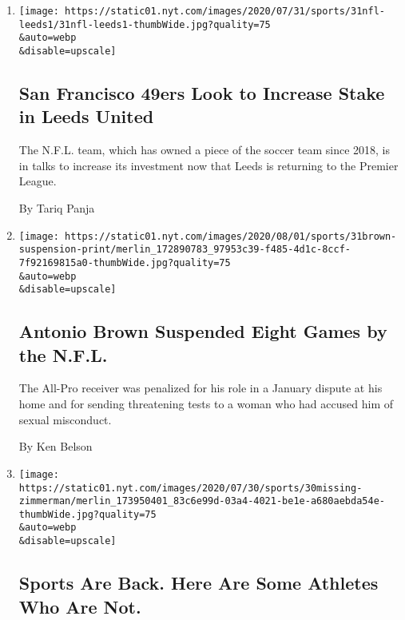 \begin{enumerate}
\def\labelenumi{\arabic{enumi}.}
\item
  \href{/2020/07/31/sports/soccer/leeds-united-san-francisco-49ers.html}{}

  \texttt{[image: https://static01.nyt.com/images/2020/07/31/sports/31nfl-leeds1/31nfl-leeds1-thumbWide.jpg?quality=75\\\&auto=webp\\\&disable=upscale]}

  \hypertarget{san-francisco-49ers-look-to-increase-stake-in-leeds-united}{%
  \subsection{San Francisco 49ers Look to Increase Stake in Leeds
  United}\label{san-francisco-49ers-look-to-increase-stake-in-leeds-united}}

  The N.F.L. team, which has owned a piece of the soccer team since
  2018, is in talks to increase its investment now that Leeds is
  returning to the Premier League.

  By Tariq Panja
\item
  \href{/2020/07/31/sports/football/antonio-brown-suspension-nfl.html}{}

  \texttt{[image: https://static01.nyt.com/images/2020/08/01/sports/31brown-suspension-print/merlin\_172890783\_97953c39-f485-4d1c-8ccf-7f92169815a0-thumbWide.jpg?quality=75\\\&auto=webp\\\&disable=upscale]}

  \hypertarget{antonio-brown-suspended-eight-games-by-the-nfl}{%
  \subsection{Antonio Brown Suspended Eight Games by the
  N.F.L.}\label{antonio-brown-suspended-eight-games-by-the-nfl}}

  The All-Pro receiver was penalized for his role in a January dispute
  at his home and for sending threatening tests to a woman who had
  accused him of sexual misconduct.

  By Ken Belson
\item
  \href{/2020/07/30/sports/players-opt-out.html}{}

  \texttt{[image: https://static01.nyt.com/images/2020/07/30/sports/30missing-zimmerman/merlin\_173950401\_83c6e99d-03a4-4021-be1e-a680aebda54e-thumbWide.jpg?quality=75\\\&auto=webp\\\&disable=upscale]}

  \hypertarget{sports-are-back-here-are-some-athletes-who-are-not}{%
  \subsection{Sports Are Back. Here Are Some Athletes Who Are
  Not.}\label{sports-are-back-here-are-some-athletes-who-are-not}}


\end{enumerate}
